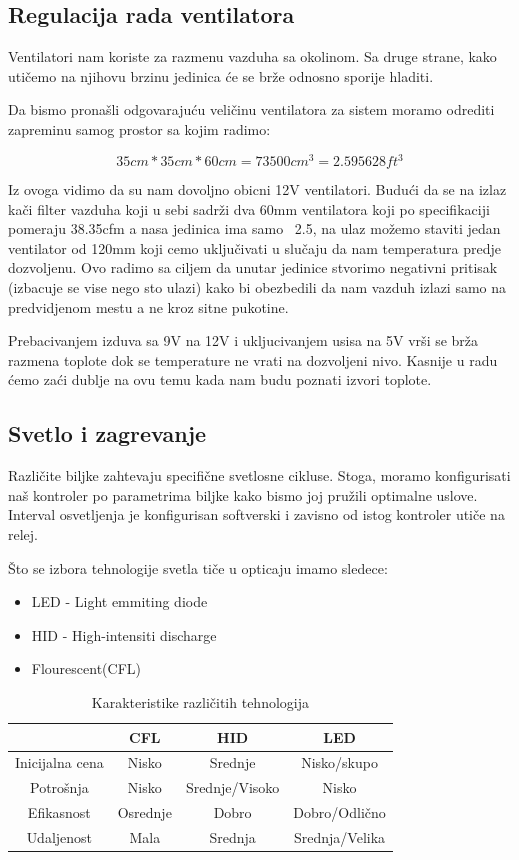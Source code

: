 \documentclass[a4paper,11pt]{book}
\begin{document}
\subsection{Regulacija rada ventilatora}
Ventilatori nam koriste za razmenu vazduha sa okolinom. Sa druge strane, kako utičemo na njihovu brzinu jedinica će se brže odnosno sporije hladiti.

Da bismo pronašli odgovarajuću veličinu ventilatora za sistem moramo odrediti zapreminu samog prostor sa kojim radimo:

\[ 35cm * 35cm * 60cm =  73500cm^3 = 2.595628ft^3\]

Iz ovoga vidimo da su nam dovoljno obicni 12V ventilatori. Budući da se na izlaz kači filter vazduha koji u sebi sadrži dva 60mm ventilatora koji po specifikaciji pomeraju 38.35cfm a nasa jedinica ima samo ~2.5, na ulaz možemo staviti jedan ventilator od 120mm koji cemo uključivati u slučaju da nam temperatura predje dozvoljenu. Ovo radimo sa ciljem da unutar jedinice stvorimo negativni pritisak (izbacuje se vise nego sto ulazi) kako bi obezbedili da nam vazduh izlazi samo na predvidjenom mestu a ne kroz sitne pukotine.

\noindent Prebacivanjem izduva sa 9V na 12V i ukljucivanjem usisa na 5V vrši se brža razmena toplote dok se temperature ne vrati na dozvoljeni nivo. Kasnije u radu ćemo zaći dublje na ovu temu kada nam budu poznati izvori toplote.


\subsection{Svetlo i zagrevanje}
Različite biljke zahtevaju specifične svetlosne cikluse. Stoga, moramo konfigurisati naš kontroler po parametrima biljke kako bismo joj pružili optimalne uslove. Interval osvetljenja je konfigurisan softverski i zavisno od istog kontroler utiče na relej. 

Što se izbora tehnologije svetla tiče u opticaju imamo sledece:

\begin{itemize}
  \item LED - Light emmiting diode
  \item HID - High-intensiti discharge
  \item Flourescent(CFL)
\end{itemize}

\begin{table}[ht]
  \caption{Karakteristike različitih tehnologija}
  \centering
  \begin{tabular}{|c|c|c|c|}
  \hline
   & CFL & HID & LED \\ \hline
  Inicijalna cena & Nisko & Srednje & Nisko/skupo \\ \hline
  Potrošnja & Nisko & Srednje/Visoko & Nisko \\ \hline
  Efikasnost & Osrednje & Dobro & Dobro/Odlično \\ \hline
  Udaljenost & Mala & Srednja & Srednja/Velika \\ \hline
  \end{tabular}
\end{table}
\end{document}
